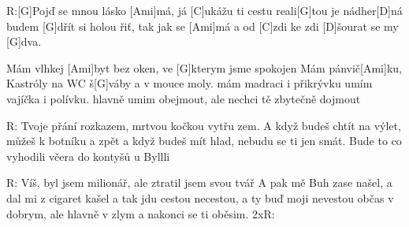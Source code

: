 
R:[G]Pojď se mnou lásko [Ami]má,
já [C]ukážu ti cestu reali[G]tou je nádher[D]ná
budem [G]dřít si holou řiť, tak jak se [Ami]má
a od [C]zdi ke zdi [D]\null šourat se my [G]dva.


Mám vlhkej [Ami]byt bez oken, ve [G]kterym jsme spokojen
Mám pánvič[Ami]ku, Kastróly na WC š[G]váby a v mouce moly.
mám madraci i přikrývku umím vajíčka i polívku.
hlavně umim obejmout, ale nechci tě zbytečně dojmout

R:
Tvoje přání rozkazem, mrtvou kočkou vytřu zem.
A když budeš chtít na výlet, můžeš k botníku a zpět
a když budeš mít hlad, nebudu se ti jen smát.
Bude to co vyhodili včera do kontyšů u Byllli

R:
Víš, byl jsem milionář, ale ztratil jsem svou tvář
A pak mě Buh zase našel, a dal mi z cigaret kašel
a tak jdu cestou necestou, a ty buď moji nevestou
občas v dobrym, ale hlavně v zlym a nakonci se ti oběsim.
2xR:
